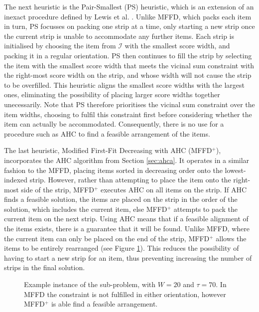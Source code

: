 \documentclass[runningheads]{llncs}
\begin{document}
The next heuristic is the Pair-Smallest (PS) heuristic, which is an extension of an inexact procedure defined by Lewis et al. \cite{lewis2011}. Unlike MFFD, which packs each item in turn, PS focusses on packing one strip at a time, only starting a new strip once the current strip is unable to accommodate any further items. Each strip is initialised by choosing the item from $\mathcal{I}$ with the smallest score width, and packing it in a regular orientation. PS then continues to fill the strip by selecting the item with the smallest score width that meets the vicinal sum constraint with the right-most score width on the strip, and whose width will not cause the strip to be overfilled. This heuristic aligns the smallest score widths with the largest ones, eliminating the possibility of placing larger score widths together unecessarily. Note that PS therefore prioritises the vicinal sum constraint over the item widths, choosing to fulfil this constraint first before considering whether the item can actually be accommodated. Consequently, there is no use for a procedure such as AHC to find a feasible arrangement of the items.

The last heuristic, Modified First-Fit Decreasing with AHC (MFFD$^+$), incorporates the AHC algorithm from Section \ref{sec:ahca}. It operates in a similar fashion to the MFFD, placing items sorted in decreasing order onto the lowest-indexed strip. However, rather than attempting to place the item onto the right-most side of the strip, MFFD$^+$ executes AHC on all items on the strip. If AHC finds a feasible solution, the items are placed on the strip in the order of the solution, which includes the current item, else MFFD$^+$ attempts to pack the current item on the next strip. Using AHC means that if a feasible alignment of the items exists, there is a guarantee that it will be found. Unlike MFFD, where the current item can only be placed on the end of the strip, MFFD$^+$ allows the items to be entirely rearranged (see Figure \ref{fig:comparestrips}). This reduces the possibility of having to start a new strip for an item, thus preventing increasing the number of strips in the final solution. 

\begin{figure}[H]	
	\centering
	
	\caption{Example instance of the sub-problem, with $W = 20$ and $\tau = 70$. In MFFD the constraint is not fulfilled in either orientation, however MFFD$^+$ is able find a feasible arrangement.}	
	\label{fig:comparestrips}
\end{figure}
\end{document}
